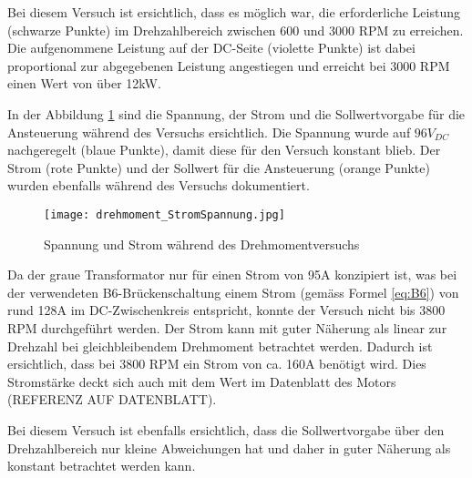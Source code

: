 Bei diesem Versuch ist ersichtlich, dass es möglich war, die erforderliche Leistung (schwarze Punkte) im Drehzahlbereich zwischen 600 und 3000 RPM zu erreichen. Die aufgenommene Leistung auf der DC-Seite (violette Punkte) ist dabei proportional zur abgegebenen Leistung angestiegen und erreicht bei 3000 RPM einen Wert von über 12kW.

In der Abbildung \ref{fig:drehmoment/StromSpannung} sind die Spannung, der Strom und die Sollwertvorgabe für die Ansteuerung während des Versuchs ersichtlich. Die Spannung wurde auf $96V_{DC}$ nachgeregelt (blaue Punkte), damit diese für den Versuch konstant blieb. Der Strom (rote Punkte) und der Sollwert für die Ansteuerung (orange Punkte) wurden ebenfalls während des Versuchs dokumentiert.


\begin{figure}[H]
	\centering
	\texttt{[image: drehmoment\_StromSpannung.jpg]}
	\caption{Spannung und Strom während des Drehmomentversuchs}\label{fig:drehmoment/StromSpannung}
\end{figure}

Da der graue Transformator nur für einen Strom von 95A konzipiert ist, was bei der verwendeten B6-Brückenschaltung einem Strom (gemäss Formel \ref{eq:B6}) von rund 128A im DC-Zwischenkreis entspricht, konnte der Versuch nicht bis 3800 RPM durchgeführt werden. Der Strom kann mit guter Näherung als linear zur Drehzahl bei gleichbleibendem Drehmoment betrachtet werden. Dadurch ist ersichtlich, dass bei 3800 RPM ein Strom von ca. 160A benötigt wird. Dies Stromstärke deckt sich auch mit dem Wert im Datenblatt des Motors (REFERENZ AUF DATENBLATT).

Bei diesem Versuch ist ebenfalls ersichtlich, dass die Sollwertvorgabe über den Drehzahlbereich nur kleine Abweichungen hat und daher in guter Näherung als konstant betrachtet werden kann.